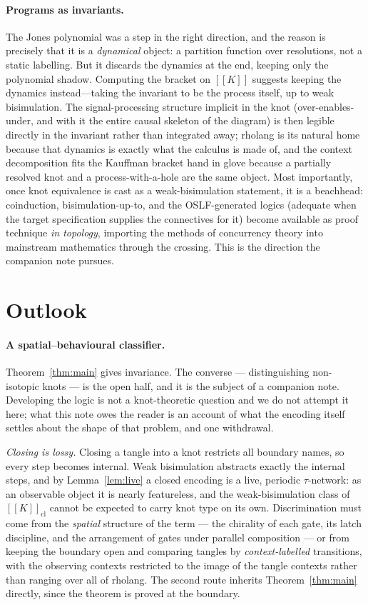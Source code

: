 \documentclass[11pt]{article}
\theoremstyle{definition}
\newcommand{\enc}[1]{[\![ #1 ]\!]}
\begin{document}
\paragraph{Programs as invariants.}
The Jones polynomial was a step in the right direction, and the reason is precisely
that it is a \emph{dynamical} object: a partition function over resolutions, not a
static labelling. But it discards the dynamics at the end, keeping only the
polynomial shadow. Computing the bracket on $\enc{K}$ suggests keeping the dynamics
instead---taking the invariant to be the process itself, up to weak bisimulation.
The signal-processing structure implicit in the knot (over-enables-under, and with
it the entire causal skeleton of the diagram) is then legible directly in the
invariant rather than integrated away; rholang is its natural home because that
dynamics is exactly what the calculus is made of, and the context decomposition fits
the Kauffman bracket hand in glove because a partially resolved knot and a
process-with-a-hole are the same object. Most importantly, once knot equivalence is
cast as a weak-bisimulation statement, it is a beachhead: coinduction,
bisimulation-up-to, and the OSLF-generated logics (adequate when the target
specification supplies the connectives for it) become available as proof technique
\emph{in topology}, importing the methods of concurrency theory into mainstream
mathematics through the crossing. This is the direction the companion note pursues.

\section{Outlook}\label{sec:outlook}

\paragraph{A spatial--behavioural classifier.}
Theorem~\ref{thm:main} gives invariance. The converse --- distinguishing
non-isotopic knots --- is the open half, and it is the subject of a companion
note. Developing the logic is not a knot-theoretic question and we do not attempt
it here; what this note owes the reader is an account of what the encoding itself
settles about the shape of that problem, and one withdrawal.

\emph{Closing is lossy.} Closing a tangle into a knot restricts all boundary
names, so every step becomes internal. Weak bisimulation abstracts exactly the
internal steps, and by Lemma~\ref{lem:live} a closed encoding is a live, periodic
$\tau$-network: as an observable object it is nearly featureless, and the
weak-bisimulation class of $\enc{K}_{\mathrm{cl}}$ cannot be expected to carry
knot type on its own. Discrimination must come from the \emph{spatial} structure
of the term --- the chirality of each gate, its latch discipline, and the
arrangement of gates under parallel composition --- or from keeping the boundary
open and comparing tangles by \emph{context-labelled} transitions, with the
observing contexts restricted to the image of the tangle contexts rather than
ranging over all of rholang. The second route inherits Theorem~\ref{thm:main}
directly, since the theorem is proved at the boundary.
\end{document}
